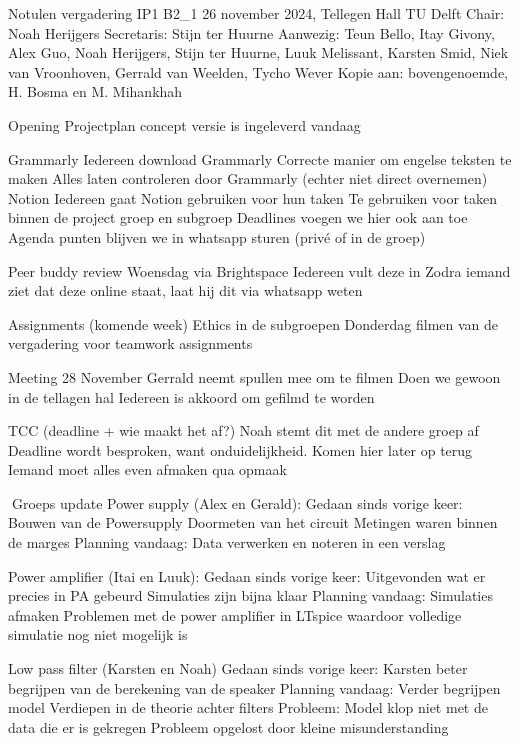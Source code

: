 Notulen vergadering IP1 B2_1
26 november 2024, Tellegen Hall TU Delft
Chair: Noah Herijgers
Secretaris: Stijn ter Huurne
Aanwezig: Teun Bello, Itay Givony, Alex Guo, Noah Herijgers, Stijn ter Huurne, Luuk Melissant, Karsten Smid, Niek van Vroonhoven, Gerrald van Weelden, Tycho Wever
Kopie aan: bovengenoemde, H. Bosma en M. Mihankhah

Opening
	Projectplan concept versie is ingeleverd vandaag 

Grammarly
	Iedereen download Grammarly
	Correcte manier om engelse teksten te maken
	Alles laten controleren door Grammarly (echter niet direct overnemen) 
Notion
	Iedereen gaat Notion gebruiken voor hun taken
	Te gebruiken voor taken binnen de project groep en subgroep
	Deadlines voegen we hier ook aan toe
	Agenda punten blijven we in whatsapp sturen (privé of in de groep)

Peer buddy review
	Woensdag via Brightspace 
	Iedereen vult deze in
	Zodra iemand ziet dat deze online staat, laat hij dit via whatsapp weten

 Assignments (komende week)
	Ethics in de subgroepen
	Donderdag filmen van de vergadering voor teamwork assignments
	
Meeting 28 November
	Gerrald neemt spullen mee om te filmen
	Doen we gewoon in de tellagen hal
	Iedereen is akkoord om gefilmd te worden

TCC (deadline + wie maakt het af?)
	Noah stemt dit met de andere groep af
	Deadline wordt besproken, want onduidelijkheid. Komen hier later op terug
	Iemand moet alles even afmaken qua opmaak 
	
Groeps update
	Power supply (Alex en Gerald):
		Gedaan sinds vorige keer:
			Bouwen van de Powersupply
			Doormeten van het circuit
			Metingen waren binnen de marges 
		Planning vandaag:
			Data verwerken en noteren in een verslag
	
	Power amplifier (Itai en Luuk):
		Gedaan sinds vorige keer:
			Uitgevonden wat er precies in PA gebeurd
			Simulaties zijn bijna klaar
		Planning vandaag:
			Simulaties afmaken
			Problemen met de power amplifier in LTspice waardoor volledige simulatie 
			nog niet mogelijk is
	
	Low pass filter (Karsten en Noah)
		Gedaan sinds vorige keer:
			Karsten beter begrijpen van de berekening van de speaker
		Planning vandaag:
			Verder begrijpen model
			Verdiepen in de theorie achter filters
		Probleem:
			Model klop niet met de data die er is gekregen 
			Probleem opgelost door kleine misunderstanding
	
